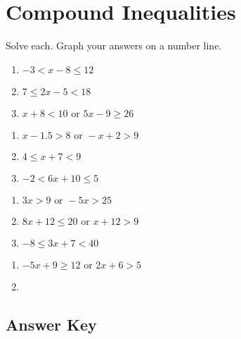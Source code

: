 \chapter{Compound Inequalities}

Solve each. Graph your answers on a number line. 

\begin{multicols}{3}
\begin{enumerate}
	\item $-3 < x-8 \leq 12$
	\item $7 \leq 2x - 5 < 18$
	\item $x + 8 < 10 \text{ or } 5x - 9 \geq 26$
\end{enumerate}	\setcounter{Review}{\value{enumi}}
\end{multicols}
\begin{multicols}{3}
\begin{enumerate}	\setcounter{enumi}{\value{Review}}
	\item $x - 1.5 > 8 \text{ or } -x + 2 > 9$
	\item $4 \leq x + 7 < 9$
	\item $-2 < 6x + 10 \leq 5$
\end{enumerate}	\setcounter{Review}{\value{enumi}}
\end{multicols}
\begin{multicols}{3}
\begin{enumerate}	\setcounter{enumi}{\value{Review}}
	\item $3x > 9 \text{ or } -5x > 25$
	\item $8x+12 \leq 20   \text{ or } x + 12 > 9$
	\item $-8 \leq 3x+7 < 40$
\end{enumerate}	\setcounter{Review}{\value{enumi}}
\end{multicols}
\begin{multicols}{3}
\begin{enumerate}	\setcounter{enumi}{\value{Review}}
	\item $-5x + 9 \geq 12 \text{ or } 2x+6 > 5$
	\item 
\end{enumerate}	\setcounter{Review}{\value{enumi}}
\end{multicols}



\newpage

\section*{Answer Key}

